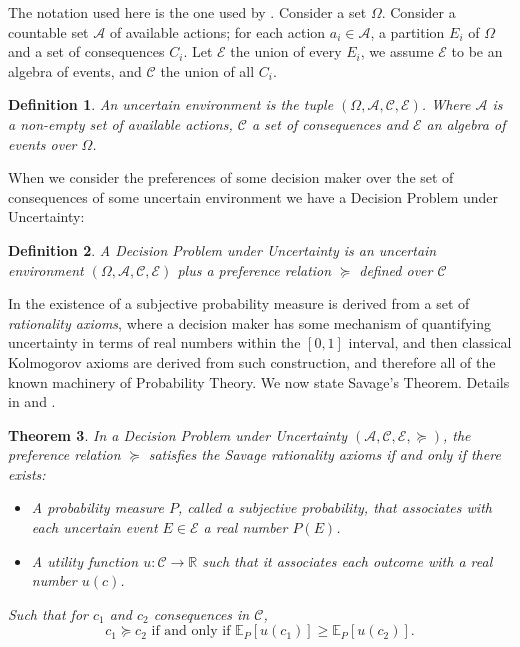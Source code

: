 \documentclass{article}
\theoremstyle{plain}
\newtheorem{teo}{Theorem}
\newtheorem{defi}[teo]{Definition}
\begin{document}
The notation used here is the one used by \cite{bernardo2000bayesian}. Consider a set $\Omega$. Consider a countable set $\mathcal{A}$ of available actions; for each action $a_i \in \mathcal{A}$, a partition $E_i$ of $\Omega$ and a set of consequences $C_i$. Let $\mathcal{E}$ the union of every $E_i$, we assume $\mathcal{E}$ to be an algebra of events, and $\mathcal{C}$ the union of all $C_i$.
\begin{defi}
An uncertain environment is the tuple $(\Omega, \mathcal{A},\mathcal{C},\mathcal{E})$. Where $\mathcal{A}$ is a non-empty set of available actions, $\mathcal{C}$ a set of consequences and $\mathcal{E}$ an algebra of events over $\Omega$. 
\end{defi}
When we consider the preferences of some decision maker over the set of consequences of some uncertain environment we have a Decision Problem under Uncertainty:
\begin{defi}
A Decision Problem under Uncertainty is an uncertain environment $(\Omega, \mathcal{A},\mathcal{C},\mathcal{E})$ plus a preference relation $\succeq$ defined over $\mathcal{C}$ 
\end{defi}
In \cite{bernardo2000bayesian} the existence of a subjective probability measure is derived from a set of \textit{rationality axioms}, where a decision maker has some mechanism of quantifying uncertainty in terms of real numbers within the $[0,1]$ interval, and then classical Kolmogorov axioms are derived from such construction, and therefore all of the known machinery of Probability Theory. We now state Savage's Theorem. Details in \cite{kreps1988choice} and \cite{bernardo2000bayesian}.
\begin{teo}
In a Decision Problem under Uncertainty $(\mathcal{A}, \mathcal{C}, \mathcal{E}, \succeq)$, the preference relation $\succeq$ satisfies the Savage rationality axioms if and only if there exists: 
\begin{itemize}
\item A \textit{probability measure} $P$, called a subjective probability, that associates with each uncertain event $E \in \mathcal{E}$ a real number $P(E)$. 
\item A utility function $u : \mathcal{C} \to \mathbb{R}$ such that it associates each outcome with a real number $u(c)$.
\end{itemize}
Such that for $c_1$ and $c_2$ consequences in $\mathcal{C}$,
\begin{equation}
 c_1 \succeq c_2 \textrm{ if and only if } \mathbb{E}_P[u(c_1)] \geq  \mathbb{E}_P[u(c_2)].
 \end{equation}
\end{teo}
\end{document}
